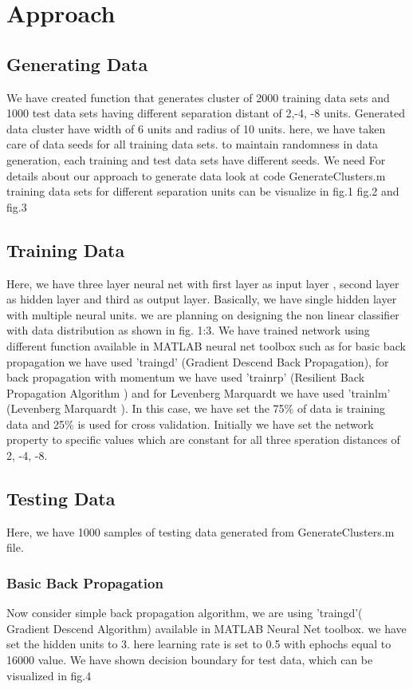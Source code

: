 \documentclass[conference]{IEEEtran}
\begin{document}
\section{Approach}


\subsection{Generating Data}
We have created function that generates cluster of 2000 training  data sets and 1000 test data sets having different separation distant of 2,-4, -8 units. Generated data cluster have width of 6 units and radius of 10 units. here, we have taken care of data seeds for all training data sets. to maintain randomness in data generation, each training and test data sets have different seeds.  We need For details about our approach to generate data look at code GenerateClusters.m 
training data sets for different separation units can be visualize in fig.1 fig.2 and fig.3

\subsection{Training Data}
Here, we have three layer neural net with first layer as input layer , second layer as hidden layer and third as output layer. Basically, we have single hidden layer with multiple neural units. we are planning on designing the non linear classifier with data distribution as shown in fig. 1:3. We have trained network using different function available in MATLAB neural net toolbox  such as for basic back propagation we have used 'traingd' (Gradient Descend Back Propagation), for back propagation with momentum we have used 'trainrp' (Resilient Back Propagation Algorithm ) and for Levenberg Marquardt we have used 'trainlm' (Levenberg Marquardt ). In this case, we have set the 75\% of data is training data and 25\% is used for cross validation.
Initially we have set the network property to specific values which are constant for all three speration distances of 2, -4, -8.

\subsection{Testing Data}
 Here, we have 1000 samples of testing data generated from GenerateClusters.m file.\\
\subsubsection{Basic Back Propagation}
 Now consider simple back propagation algorithm, we are using 'traingd'( Gradient Descend Algorithm) available in MATLAB Neural Net toolbox. we have set the hidden units to 3. here learning rate is set to 0.5 with ephochs equal to 16000 value. We have shown decision boundary for test data, which can be visualized in fig.4
 \\
\end{document}

